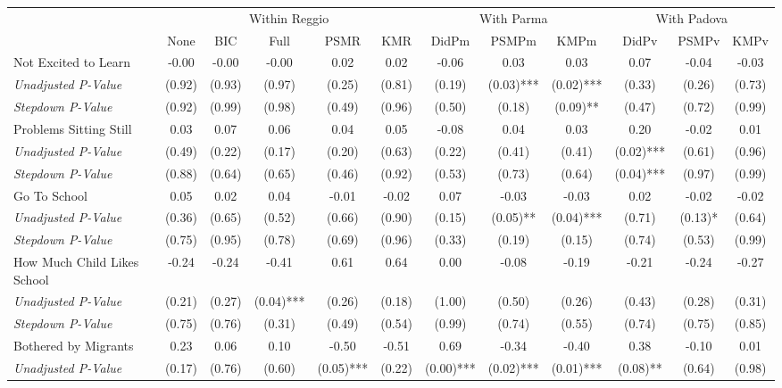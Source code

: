 \begin{tabular}{l c c c c c c c c c c c}
\toprule
& \multicolumn{5}{c}{Within Reggio} & \multicolumn{3}{c}{With Parma} & \multicolumn{3}{c}{With Padova} \\\cmidrule(lr){2-6} \cmidrule(lr){7-9} \cmidrule(lr){10-12}
 & None & BIC & Full & PSMR & KMR & DidPm & PSMPm & KMPm & DidPv & PSMPv & KMPv \\
\midrule
Not Excited to Learn & -0.00 & -0.00 & -0.00 & 0.02 & 0.02 & -0.06 & 0.03 & 0.03 & 0.07 & -0.04 & -0.03 \\
\quad \textit{Unadjusted P-Value} & (0.92) & (0.93) & (0.97) & (0.25) & (0.81) & (0.19) & (0.03)*** & (0.02)*** & (0.33) & (0.26) & (0.73) \\
\quad \textit{Stepdown P-Value} & (0.92) & (0.99) & (0.98) & (0.49) & (0.96) & (0.50) & (0.18) & (0.09)** & (0.47) & (0.72) & (0.99) \\
Problems Sitting Still & 0.03 & 0.07 & 0.06 & 0.04 & 0.05 & -0.08 & 0.04 & 0.03 & 0.20 & -0.02 & 0.01 \\
\quad \textit{Unadjusted P-Value} & (0.49) & (0.22) & (0.17) & (0.20) & (0.63) & (0.22) & (0.41) & (0.41) & (0.02)*** & (0.61) & (0.96) \\
\quad \textit{Stepdown P-Value} & (0.88) & (0.64) & (0.65) & (0.46) & (0.92) & (0.53) & (0.73) & (0.64) & (0.04)*** & (0.97) & (0.99) \\
Go To School & 0.05 & 0.02 & 0.04 & -0.01 & -0.02 & 0.07 & -0.03 & -0.03 & 0.02 & -0.02 & -0.02 \\
\quad \textit{Unadjusted P-Value} & (0.36) & (0.65) & (0.52) & (0.66) & (0.90) & (0.15) & (0.05)** & (0.04)*** & (0.71) & (0.13)* & (0.64) \\
\quad \textit{Stepdown P-Value} & (0.75) & (0.95) & (0.78) & (0.69) & (0.96) & (0.33) & (0.19) & (0.15) & (0.74) & (0.53) & (0.99) \\
How Much Child Likes School & -0.24 & -0.24 & -0.41 & 0.61 & 0.64 & 0.00 & -0.08 & -0.19 & -0.21 & -0.24 & -0.27 \\
\quad \textit{Unadjusted P-Value} & (0.21) & (0.27) & (0.04)*** & (0.26) & (0.18) & (1.00) & (0.50) & (0.26) & (0.43) & (0.28) & (0.31) \\
\quad \textit{Stepdown P-Value} & (0.75) & (0.76) & (0.31) & (0.49) & (0.54) & (0.99) & (0.74) & (0.55) & (0.74) & (0.75) & (0.85) \\
Bothered by Migrants & 0.23 & 0.06 & 0.10 & -0.50 & -0.51 & 0.69 & -0.34 & -0.40 & 0.38 & -0.10 & 0.01 \\
\quad \textit{Unadjusted P-Value} & (0.17) & (0.76) & (0.60) & (0.05)*** & (0.22) & (0.00)*** & (0.02)*** & (0.01)*** & (0.08)** & (0.64) & (0.98) \\

\end{tabular}
